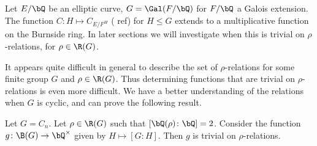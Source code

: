 \begin{example}
Let $E / \bQ$ be an elliptic curve, $G = \Gal(F / \bQ)$ for $F / \bQ$ a Galois extension. The function $C \colon H \mapsto C_{E / F^H}$ ({\color{red} ref}) for $H \leq G$ extends to a multiplicative function on the Burnside ring. In later sections we will investigate when this is trivial on $\rho$-relations, for $\rho \in \R(G)$. 
\end{example}

It appears quite difficult in general to describe the set of $\rho$-relations for some finite group $G$ and $\rho \in \R(G)$. Thus determining functions that are trivial on $\rho$-relations is even more difficult. We have a better understanding of the relations when $G$ is cyclic, and can prove the following result.

\begin{prop}\label{index-fn-trivial}
    Let $G = C_n$. Let $\rho \in \R(G)$ such that $[\bQ(\rho) \colon \bQ] = 2$. Consider the function $g \colon \B(G) \to \bQ^{\times}$ given by $H \mapsto [G : H]$. Then $g$ is trivial on $\rho$-relations.
\end{prop}

